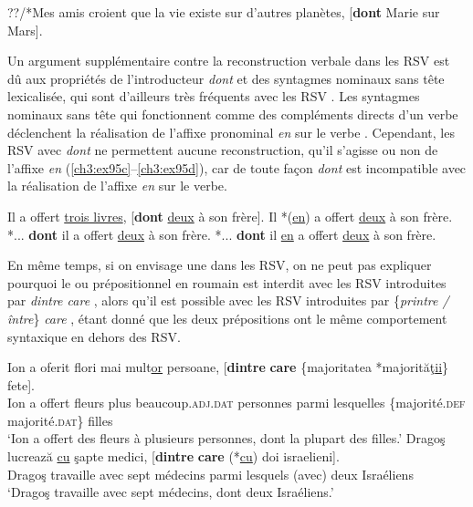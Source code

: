 \ea \label{ch3:ex94} 
??/*Mes amis croient que la vie existe sur d’autres planètes, [\textbf{dont} Marie sur Mars].   
\z

Un argument supplémentaire contre la reconstruction verbale dans les RSV est dû aux propriétés de l’introducteur \textit{dont} et des syntagmes nominaux sans tête lexicalisée, qui sont d’ailleurs très fréquents avec les RSV . Les syntagmes nominaux sans tête qui fonctionnent comme des compléments directs d’un verbe déclenchent la réalisation de l’affixe pronominal \textit{en} sur le verbe . Cependant, les RSV avec \textit{dont} ne permettent aucune reconstruction, qu’il s’agisse ou non de l’affixe \textit{en} (\ref{ch3:ex95c}--\ref{ch3:ex95d}), car de toute façon \textit{dont} est incompatible avec la réalisation de l’affixe \textit{en} sur le verbe.

\ea \label{ch3:ex95}
\ea 
Il a offert \uline{trois livres}, [\textbf{dont} \uline{deux} à son frère]. \label{ch3:ex95a}
\ex
Il *(\uline{en}) a offert \uline{deux} à son frère. \label{ch3:ex95b}
\ex 
*... \textbf{dont} il a offert \uline{deux} à son frère. \label{ch3:ex95c}
\ex 
*... \textbf{dont} il \uline{en} a offert \uline{deux} à son frère. \label{ch3:ex95d}
\z 
\z

En même temps, si on envisage une  dans les RSV, on ne peut pas expliquer pourquoi le  ou prépositionnel en roumain est interdit avec les RSV introduites par \textit{dintre care} , alors qu’il est possible avec les RSV introduites par \{\textit{printre / între}\} \textit{care} , étant donné que les deux prépositions ont le même comportement syntaxique en dehors des RSV.

\ea \label{ch3:ex96}
\ea 
\gll Ion  a  oferit  flori  mai  mult\uline{or}  persoane,  [\textbf{dintre}  \textbf{care} \{majoritatea  {\textbar}  *majorităţ\uline{ii}\}  fete]. \label{ch3:ex96a}\\
Ion  a  offert  fleurs  plus  beaucoup.\textsc{adj.dat}  personnes  parmi  lesquelles \{majorité.\textsc{def} {\textbar}  majorité.\textsc{dat}\}  filles \\
\glt ‘Ion a offert des fleurs à plusieurs personnes, dont la plupart des filles.’
\ex 
\gll Dragoş  lucrează  \uline{cu}  şapte  medici,  [\textbf{dintre} \textbf{care}  (*\uline{cu})  doi  israelieni]. \label{ch3:ex96b}\\
Dragoş  travaille  avec  sept  médecins  parmi  lesquels  (avec) deux  Israéliens \\
\glt ‘Dragoş travaille avec sept médecins, dont deux Israéliens.’
\z 
\z

